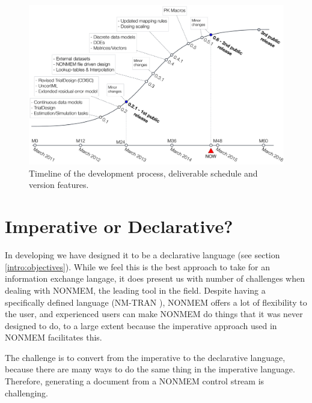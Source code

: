 \begin{figure}[ht!]
\centering
  \includegraphics[width=0.95\linewidth]{pics/Timeline.pdf}
 \caption{Timeline of the \pharmml development process, deliverable schedule and version 
 features.}
 \label{fig:DDMoReTimeline}
\end{figure}

\section{Imperative or Declarative?}

In developing \pharmml we have designed it to be a declarative language (see section \ref{intro:objectives}).
While we feel this is the best approach to take for an information exchange langage, it does present us
with number of challenges when dealing with NONMEM, the leading tool in the field. Despite
having a specifically defined language (NM-TRAN \cite{NONMEM:2009}), NONMEM offers a lot of flexibility
to the user, and experienced users can make NONMEM do things that it was never designed to do, to a large
extent because the imperative approach used in NONMEM facilitates this.

The challenge is to convert from the imperative to the declarative language, because there are 
many ways to do the same thing in the imperative language. Therefore, generating 
a \pharmml document from a NONMEM control stream is challenging.


